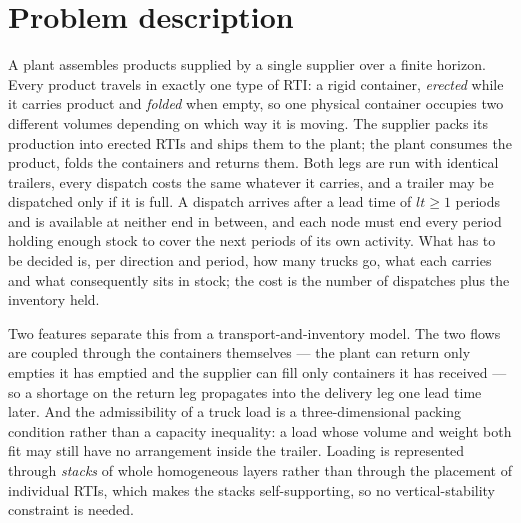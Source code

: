 \section{Problem description}
\label{sec:problem}

A plant assembles products supplied by a single supplier over a finite
horizon. Every product travels in exactly one type of RTI: a rigid
container, \emph{erected} while it carries product and \emph{folded}
when empty, so one physical container occupies two different volumes
depending on which way it is moving. The supplier packs its production
into erected RTIs and ships them to the plant; the plant consumes the
product, folds the containers and returns them. Both legs are run with
identical trailers, every dispatch costs the same whatever it carries,
and a trailer may be dispatched only if it is full. A dispatch arrives
after a lead time of $lt\ge1$ periods and is available at neither end
in between, and each node must end every period holding enough stock to
cover the next periods of its own activity. What has to be decided is,
per direction and period, how many trucks go, what each carries and
what consequently sits in stock; the cost is the number of dispatches
plus the inventory held.

Two features separate this from a transport-and-inventory model. The
two flows are coupled through the containers themselves --- the plant
can return only empties it has emptied and the supplier can fill only
containers it has received --- so a shortage on the return leg
propagates into the delivery leg one lead time later. And the
admissibility of a truck load is a three-dimensional packing condition
rather than a capacity inequality: a load whose volume and weight both
fit may still have no arrangement inside the trailer. Loading is
represented through \emph{stacks} of whole homogeneous layers rather
than through the placement of individual RTIs, which makes the stacks
self-supporting, so no vertical-stability constraint is needed.
